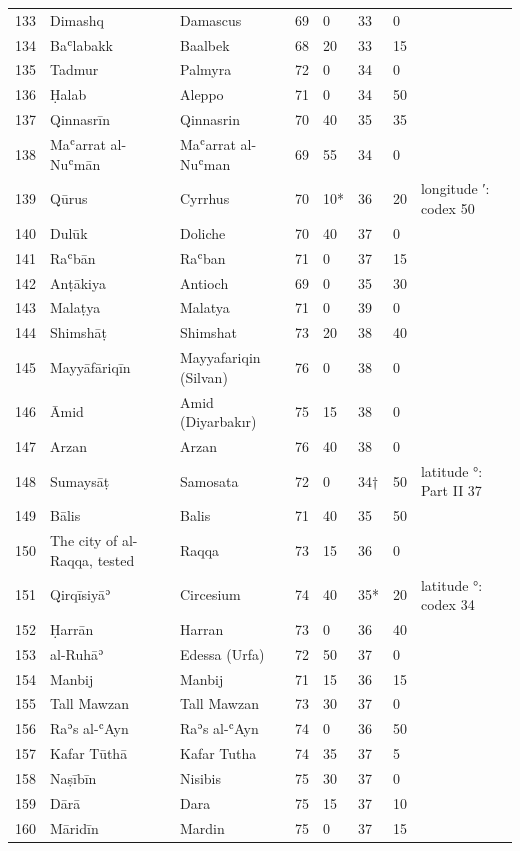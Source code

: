 {\begin{longtable}{R{8mm}L{42mm}L{34mm}R{7mm}R{6mm}R{6mm}R{6mm}L{24mm}}
133 & Dimashq & Damascus & 69 & 0 & 33 & 0 & \\
134 & Baʿlabakk & Baalbek & 68 & 20 & 33 & 15 & \\
135 & Tadmur & Palmyra & 72 & 0 & 34 & 0 & \\
136 & Ḥalab & Aleppo & 71 & 0 & 34 & 50 & \\
137 & Qinnasrīn & Qinnasrin & 70 & 40 & 35 & 35 & \\
138 & Maʿarrat al-Nuʿmān & Maʿarrat al-Nuʿman & 69 & 55 & 34 & 0 & \\
139 & Qūrus & Cyrrhus & 70 & 10* & 36 & 20 & longitude ′: codex 50\\
140 & Dulūk & Doliche & 70 & 40 & 37 & 0 & \\
141 & Raʿbān & Raʿban & 71 & 0 & 37 & 15 & \\
142 & Anṭākiya & Antioch & 69 & 0 & 35 & 30 & \\
143 & Malaṭya & Malatya & 71 & 0 & 39 & 0 & \\
144 & Shimshāṭ & Shimshat & 73 & 20 & 38 & 40 & \\
145 & Mayyāfāriqīn & Mayyafariqin (Silvan) & 76 & 0 & 38 & 0 & \\
146 & Āmid & Amid (Diyarbakır) & 75 & 15 & 38 & 0 & \\
147 & Arzan & Arzan & 76 & 40 & 38 & 0 & \\
148 & Sumaysāṭ & Samosata & 72 & 0 & 34† & 50 & latitude °: Part II 37\\
149 & Bālis & Balis & 71 & 40 & 35 & 50 & \\
150 & The city of al-Raqqa, tested & Raqqa & 73 & 15 & 36 & 0 & \\
151 & Qirqīsiyāʾ & Circesium & 74 & 40 & 35* & 20 & latitude °: codex 34\\
152 & Ḥarrān & Harran & 73 & 0 & 36 & 40 & \\
153 & al-Ruhāʾ & Edessa (Urfa) & 72 & 50 & 37 & 0 & \\
154 & Manbij & Manbij & 71 & 15 & 36 & 15 & \\
155 & Tall Mawzan & Tall Mawzan & 73 & 30 & 37 & 0 & \\
156 & Raʾs al-ʿAyn & Raʾs al-ʿAyn & 74 & 0 & 36 & 50 & \\
157 & Kafar Tūthā & Kafar Tutha & 74 & 35 & 37 & 5 & \\
158 & Naṣībīn & Nisibis & 75 & 30 & 37 & 0 & \\
159 & Dārā & Dara & 75 & 15 & 37 & 10 & \\
160 & Māridīn & Mardin & 75 & 0 & 37 & 15 & \\

\end{longtable}}

